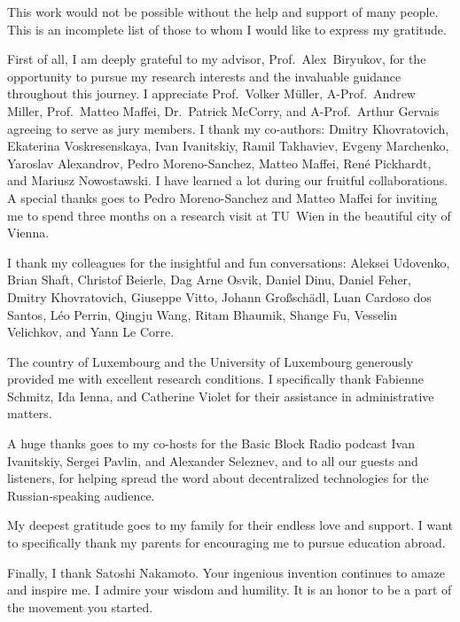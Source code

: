 \begin{acknowledgements}
\addchaptertocentry{\acknowledgementname} %
This work would not be possible without the help and support of many people.
This is an incomplete list of those to whom I would like to express my gratitude.

First of all, I am deeply grateful to my advisor, Prof.~Alex~Biryukov, for the opportunity to pursue my research interests and the invaluable guidance throughout this journey.
I appreciate Prof.~Volker M{\"u}ller, A-Prof.~Andrew Miller, Prof.~Matteo Maffei, Dr.~Patrick McCorry, and A-Prof.~Arthur Gervais agreeing to serve as jury members.
I thank my co-authors: Dmitry Khovratovich, Ekaterina Voskresenskaya, Ivan Ivanitskiy, Ramil Takhaviev, Evgeny Marchenko, Yaroslav Alexandrov, Pedro Moreno-Sanchez, Matteo Maffei, Ren{\'e} Pickhardt, and Mariusz Nowostawski.
I have learned a lot during our fruitful collaborations.
A special thanks goes to Pedro Moreno-Sanchez and Matteo Maffei for inviting me to spend three months on a research visit at TU~Wien in the beautiful city of Vienna.

I thank my colleagues for the insightful and fun conversations: Aleksei Udovenko, Brian Shaft, Christof Beierle, Dag Arne Osvik, Daniel Dinu, Daniel Feher, Dmitry Khovratovich, Giuseppe Vitto, Johann Gro{\ss}sch{\"a}dl, Luan Cardoso dos Santos, L{\'e}o Perrin, Qingju Wang, Ritam Bhaumik, Shange Fu, Vesselin Velichkov, and Yann Le Corre.

The country of Luxembourg and the University of Luxembourg generously provided me with excellent research conditions.
I specifically thank Fabienne Schmitz, Ida Ienna, and Catherine Violet for their assistance in administrative matters.

A huge thanks goes to my co-hosts for the Basic Block Radio podcast Ivan Ivanitskiy, Sergei Pavlin, and Alexander Seleznev, and to all our guests and listeners, for helping spread the word about decentralized technologies for the Russian-speaking audience.

My deepest gratitude goes to my family for their endless love and support.
I want to specifically thank my parents for encouraging me to pursue education abroad.

Finally, I thank Satoshi Nakamoto.
Your ingenious invention continues to amaze and inspire me.
I admire your wisdom and humility.
It is an honor to be a part of the movement you started.

\end{acknowledgements}

